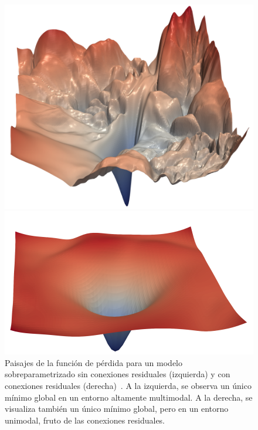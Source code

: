 \begin{figure}[h!]
    \centering
    \begin{minipage}{0.45\textwidth}
        \centering
        \includegraphics[width=\linewidth]{img/experiments/landscapemultimodal.png}
    \end{minipage}
    \hfill
    \begin{minipage}{0.45\textwidth}
        \centering
        \includegraphics[width=\linewidth]{img/experiments/landscapeunimodal.png}
    \end{minipage}
    \caption[Paisajes de la función de pérdida para distintos modelos sobreparametrizados~\cite{Li2018}.]{Paisajes de la función de pérdida para un modelo sobreparametrizado sin conexiones residuales (izquierda) y con conexiones residuales (derecha)~\cite{Li2018}. A la izquierda, se observa un único mínimo global en un entorno altamente multimodal. A la derecha, se visualiza también un único mínimo global, pero en un entorno unimodal, fruto de las conexiones residuales.}\label{fig:landscapes}
\end{figure} 

